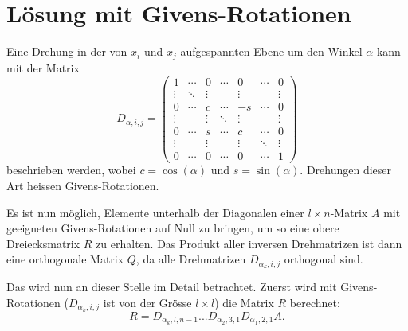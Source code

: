 %
%
%
\section{Lösung mit Givens-Rotationen
\label{qr:section:loesung}}
Eine Drehung in der von $x_i$ und $x_j$ aufgespannten Ebene um den Winkel $\alpha$ kann mit der Matrix
\begin{equation}
D_{\alpha,i,j}=
\begin{pmatrix}
1     &\cdots&0     &\cdots&0     &\cdots&0\\
\vdots&\ddots&\vdots&      &\vdots&      &\vdots\\
0     &\cdots&c     &\cdots&-s    &\cdots&0\\
\vdots&      &\vdots&\ddots&\vdots&      &\vdots\\
0     &\cdots&s     &\cdots&c     &\cdots&0\\
\vdots&      &\vdots&      &\vdots&\ddots&\vdots\\
0     &\cdots&0     &\cdots&0     &\cdots&1
\end{pmatrix}
\end{equation}
beschrieben werden, wobei $c=\cos(\alpha)$ und $s=\sin(\alpha)$.
Drehungen dieser Art heissen Givens-Rotationen.

Es ist nun möglich, Elemente unterhalb der Diagonalen einer $l\times n $-Matrix $A$ mit geeigneten Givens-Rotationen auf Null zu bringen, um so eine obere Dreiecksmatrix $R$ zu erhalten.
Das Produkt aller inversen Drehmatrizen ist dann eine orthogonale Matrix $Q$, da alle Drehmatrizen $D_{\alpha_k,i,j}$ orthogonal sind.

Das wird nun an dieser Stelle im Detail betrachtet.
Zuerst wird mit Givens-Rotationen ($D_{\alpha_k, i, j}$ ist von der Grösse $l\times l$) die Matrix $R$ berechnet: 
\begin{equation*}
R = D_{\alpha_k,l,n-1}...D_{\alpha_2,3,1}D_{\alpha_1,2,1}A.		
\end{equation*}


